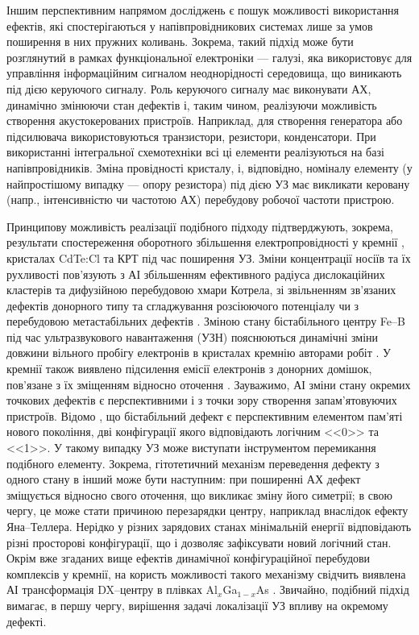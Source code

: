 Іншим перспективним напрямом досліджень є пошук можливості використання
ефектів, які спостерігаються у напівпровідникових системах
лише за умов поширення в них пружних коливань.
Зокрема, такий підхід може бути розглянутий в рамках функціональної електроніки --- галузі,
яка використовує для управління інформаційним сигналом неоднорідності середовища,  що виникають під дією керуючого сигналу.
Роль керуючого сигналу має виконувати АХ, динамічно змінюючи стан дефектів і, таким чином, реалізуючи можливість створення акустокерованих пристроїв.
Наприклад, для створення генератора або підсилювача використовуються транзистори, резистори, конденсатори.
При використанні інтегральної схемотехніки всі ці елементи реалізуються на базі напівпровідників.
Зміна провідності кристалу, і, відповідно, номіналу елементу (у найпростішому випадку --- опору резистора) під дією УЗ
має викликати керовану (напр., інтенсивністю чи частотою АХ) перебудову робочої частоти пристрою.

Принципову можливість реалізації подібного підходу підтверджують, зокрема, результати спостереження оборотного
збільшення електропровідності у кремнії \cite{YOlikhTPL2011r}, кристалах CdTe:Cl \cite{YOlikh:UFG2016,YOlikh:SupMicr} та КРТ \cite{OlikhYFTP99,OlikhYFTP2000} під час поширення УЗ.
Зміни концентрації носіїв та їх рухливості пов'язують з АІ
збільшенням ефективного радіуса дислокаційних кластерів та дифузійною перебудовою хмари Котрела\cite{YOlikh:UFG2016,YOlikh:SupMicr},
зі звільненням зв'язаних дефектів донорного типу та сгладжування розсіюючого потенціалу \cite{OlikhYFTP99,OlikhYFTP2000}
чи з перебудовою метастабільних дефектів \cite{YOlikhTPL2011r}.
Зміною стану бістабільного центру Fe--B під час ультразвукового навантаження (УЗН) пояснюються динамічні зміни довжини вільного пробігу електронів в кристалах кремнію авторами робіт \cite{Ostrovskii2001,OlikhFTT}.
У кремнії також виявлено підсилення емісії електронів з донорних домішок, пов'язане з їх зміщенням відносно оточення \cite{Korotchenkov1995}.
Зауважимо, АІ зміни стану окремих точкових дефектів є перспективними і з точки зору створення запам'ятовуючих пристроїв.
Відомо \cite{MetaUFN}, що бістабільний дефект є перспективним елементом пам'яті нового покоління,
дві конфігурації якого відповідають логічним <<0>> та <<1>>.
У такому випадку УЗ може виступати інструментом перемикання подібного елементу.
Зокрема, гітотетичний механізм переведення дефекту з одного стану в інший може бути наступним:
при поширенні АХ дефект зміщується відносно свого оточення, що викликає зміну його симетрії;
в свою чергу, це може стати причиною перезарядки центру, наприклад внаслідок ефекту Яна--Теллера.
Нерідко у різних зарядових станах мінімальній енергії відповідають різні просторові конфігурації, що і дозволяє зафіксувати новий логічний стан.
Окрім вже згаданих вище ефектів динамічної конфігураційної перебудови комплексів у кремнії, на користь
можливості такого механізму свідчить виявлена АІ трансформація DX--центру в плівках Al$_x$Ga$_{1-x}$As \cite{belyaev1994}.
Звичайно, подібний підхід вимагає, в першу чергу, вирішення задачі локалізації УЗ впливу на окремому дефекті.

